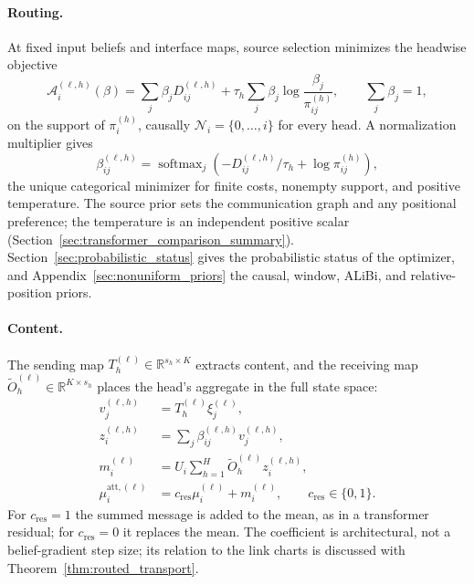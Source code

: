 \documentclass[twoside,11pt]{article}
\newcommand{\softmax}{\operatorname{softmax}}
\begin{document}
\paragraph{Routing.} At fixed input beliefs and interface maps, source selection minimizes the headwise objective
\begin{equation}
\mathcal A_i^{(\ell,h)}(\beta)
=\sum_j\beta_jD_{ij}^{(\ell,h)}
+\tau_h\sum_j\beta_j\log\frac{\beta_j}{\pi_{ij}^{(h)}},
\qquad \sum_j\beta_j=1,
\label{eq:relational_routing_objective}
\end{equation}
on the support of \(\pi_i^{(h)}\), causally \(\mathcal N_i=\{0,\ldots,i\}\) for every head. A normalization multiplier gives
\begin{equation}
\beta_{ij}^{(\ell,h)}
=\softmax_j\left(-D_{ij}^{(\ell,h)}/\tau_h+\log\pi_{ij}^{(h)}\right),
\label{eq:relational_routing}
\end{equation}
the unique categorical minimizer for finite costs, nonempty support, and positive temperature. The source prior sets the communication graph and any positional preference; the temperature is an independent positive scalar (Section~\ref{sec:transformer_comparison_summary}). Section~\ref{sec:probabilistic_status} gives the probabilistic status of the optimizer, and Appendix~\ref{sec:nonuniform_priors} the causal, window, ALiBi, and relative-position priors.

\paragraph{Content.} The sending map \(T_h^{(\ell)}\in\mathbb R^{s_h\times K}\) extracts content, and the receiving map \(\widetilde O_h^{(\ell)}\in\mathbb R^{K\times s_h}\) places the head's aggregate in the full state space:
\begin{align}
v_j^{(\ell,h)}&=T_h^{(\ell)}\xi_j^{(\ell)},\\
z_i^{(\ell,h)}&=\sum_j\beta_{ij}^{(\ell,h)}v_j^{(\ell,h)},\\
m_i^{(\ell)}&=U_i\sum_{h=1}^{H}\widetilde O_h^{(\ell)}z_i^{(\ell,h)},\\
\mu_i^{\mathrm{att},(\ell)}&=c_{\mathrm{res}}\mu_i^{(\ell)}+m_i^{(\ell)},\qquad c_{\mathrm{res}}\in\{0,1\}.
\label{eq:relational_predictive_residual}
\end{align}
For \(c_{\mathrm{res}}=1\) the summed message is added to the mean, as in a transformer residual; for \(c_{\mathrm{res}}=0\) it replaces the mean. The coefficient is architectural, not a belief-gradient step size; its relation to the link charts is discussed with Theorem~\ref{thm:routed_transport}.
\end{document}

